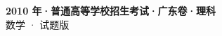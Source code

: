 \documentclass[zihao=-4, a4paper]{ctexart}
\begin{document}
\begin{center}
  {\Large\bfseries 2010 年·普通高等学校招生考试·广东卷·理科}\\[4pt]
  {\large 数学 · 试题版}
\end{center}
\medskip
{}

\end{document}
